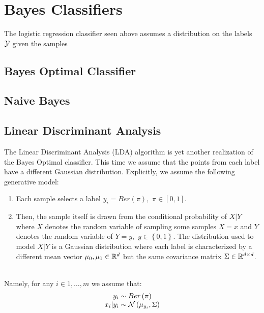 \section{Bayes Classifiers}
The logistic regression classifier seen above assumes a distribution on the labels $\mathcal{Y}$ given the samples  

\subsection{Bayes Optimal Classifier}

\subsection{Naive Bayes}

\subsection{Linear Discriminant Analysis}
The Linear Discriminant Analysis (LDA) algorithm is yet another realization of the Bayes Optimal classifier. This time we assume that the points from each label have a different Gaussian distribution. Explicitly, we assume the following generative model: 
\begin{enumerate}
	\item Each sample selects a label $y_i=Ber\left(\pi\right),\,\,\pi\in\left[0,1\right]$.
	\item Then, the sample itself is drawn from the conditional probability of $X|Y$ where $X$ denotes the random variable of sampling some samples $X=x$ and $Y$ denotes the random variable of $Y=y,\,\,y\in\left\{0,1\right\}$. The distribution used to model $X|Y$ is a Gaussian distribution where each label is characterized by a different mean vector $\mu_0,\mu_1\in\mathbb{R}^d$ but the same covariance matrix $\Sigma\in\mathbb{R}^{d\times d}$.
\end{enumerate}~\\
Namely, for any $i\in 1,\ldots,m$ we assume that:
\begin{equation}\label{lda_generative}
\begin{array}{c}
	y_i \sim Ber\left(\pi\right) \\
	x_i|y_i \sim \mathcal{N}\left(\mu_{y_i},\Sigma\right)
\end{array}
\end{equation}



